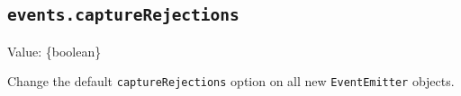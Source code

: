 \begin{Shaded}
\begin{Highlighting}[]
\NormalTok{ \{ }\OperatorTok{,}\OperatorTok{=} \NormalTok{(}\NormalTok{)}\OperatorTok{;}

\OperatorTok{=}  \NormalTok{()}\OperatorTok{;}

  \NormalTok{() \{}
   \NormalTok{([}\OperatorTok{,} \NormalTok{)}\OperatorTok{,} \OperatorTok{,} \NormalTok{)])}\OperatorTok{;}
  \NormalTok{(}\OperatorTok{,} \NormalTok{)}\OperatorTok{;}
\NormalTok{\}}

\NormalTok{(() }\KeywordTok{=\textgreater{}}\NormalTok{ \{}
\NormalTok{(}\NormalTok{)}\OperatorTok{;}
\NormalTok{(}\NormalTok{)}\OperatorTok{;}
\NormalTok{\})}\OperatorTok{;}

\NormalTok{()}\NormalTok{(() }\KeywordTok{=\textgreater{}} \NormalTok{(}\NormalTok{))}\OperatorTok{;}
\end{Highlighting}
\end{Shaded}

\subsection{\texorpdfstring{\texttt{events.captureRejections}}{events.captureRejections}}\label{events.capturerejections}

Value: \{boolean\}

Change the default \texttt{captureRejections} option on all new
\texttt{EventEmitter} objects.

